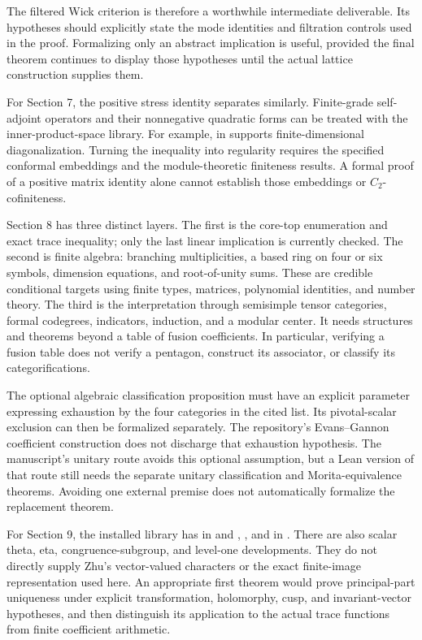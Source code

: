 The filtered Wick criterion is therefore a worthwhile intermediate
deliverable. Its hypotheses should explicitly state the mode identities
and filtration controls used in the proof. Formalizing only an abstract
implication is useful, provided the final theorem continues to display
those hypotheses until the actual lattice construction supplies them.

For Section 7, the positive stress identity separates similarly.
Finite-grade self-adjoint operators and their nonnegative quadratic
forms can be treated with the inner-product-space library. For example,
 in
 supports
finite-dimensional diagonalization. Turning the inequality into
regularity requires the specified conformal embeddings and the
module-theoretic finiteness results. A formal proof of a positive
matrix identity alone cannot establish those embeddings or
$C_2$-cofiniteness.

Section 8 has three distinct layers. The first is the core-top
enumeration and exact trace inequality; only the last linear implication
is currently checked. The second is finite algebra: branching
multiplicities, a based ring on four or six symbols, dimension equations,
and root-of-unity sums. These are credible conditional targets using
finite types, matrices, polynomial identities, and number theory.
The third is the interpretation through semisimple tensor categories,
formal codegrees, indicators, induction, and a modular center. It needs
structures and theorems beyond a table of fusion coefficients. In
particular, verifying a fusion table does not verify a pentagon,
construct its associator, or classify its categorifications.

The optional algebraic classification proposition must have an explicit
parameter expressing exhaustion by the four categories in the cited
list. Its pivotal-scalar exclusion can then be formalized separately.
The repository's Evans--Gannon coefficient construction does not
discharge that exhaustion hypothesis. The manuscript's unitary route
avoids this optional assumption, but a Lean version of that route still
needs the separate unitary classification and Morita-equivalence
theorems. Avoiding one external premise does not automatically formalize
the replacement theorem.

For Section 9, the installed library has  in
 and
,
, and
 in
.
There are also scalar theta, eta, congruence-subgroup, and level-one
developments. They do not directly supply Zhu's vector-valued
characters or the exact finite-image representation used here.
An appropriate first theorem would prove principal-part uniqueness
under explicit transformation, holomorphy, cusp, and invariant-vector
hypotheses, and then distinguish its application to the actual trace
functions from finite coefficient arithmetic.

